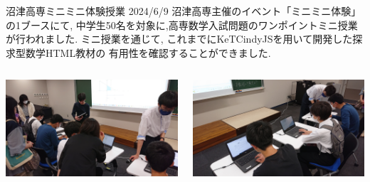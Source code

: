 \documentclass[dvipdfmx, unicode]{beamer}
\begin{document}
\begin{frame}[t]{沼津高専ミニミニ体験授業 2024/6/9}
  沼津高専主催のイベント「ミニミニ体験」の1ブースにて,
  中学生50名を対象に,高専数学入試問題のワンポイントミニ授業が行われました.
  ミニ授業を通じて, これまでにKeTCindyJSを用いて開発した探求型数学HTML教材の
  有用性を確認することができました.
  \begin{columns}[T]
    \begin{column}{0.5\linewidth}
      \includegraphics[width=\linewidth]{img/ActiveReport/20240609_minimini1.jpg}
    \end{column}
    \begin{column}{0.5\linewidth}
      \includegraphics[width=\linewidth]{img/ActiveReport/20240609_minimini2.jpg}
    \end{column}
  \end{columns}
\end{frame}
\end{document}
